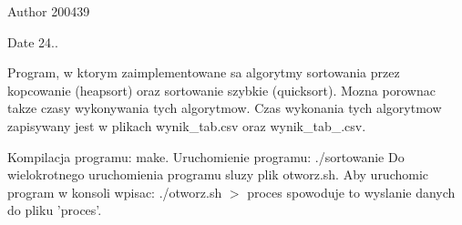 \begin{DoxyAuthor}{\-Author}
200439 
\end{DoxyAuthor}
\begin{DoxyDate}{\-Date}
24..
\end{DoxyDate}
\-Program, w ktorym zaimplementowane sa algorytmy sortowania przez kopcowanie (heapsort) oraz sortowanie szybkie (quicksort). \-Mozna porownac takze czasy wykonywania tych algorytmow. \-Czas wykonania tych algorytmow zapisywany jest w plikach wynik\-\_\-tab.\-csv oraz wynik\-\_\-tab\-\_.\-csv.

\-Kompilacja programu\-: make. \-Uruchomienie programu\-: ./sortowanie \-Do wielokrotnego uruchomienia programu sluzy plik otworz.\-sh. \-Aby uruchomic program w konsoli wpisac\-: ./otworz.sh $>$ proces spowoduje to wyslanie danych do pliku 'proces'. 